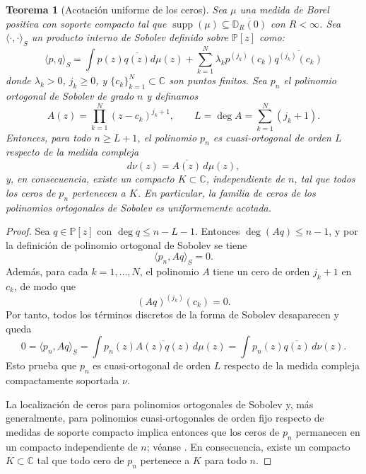 \documentclass[12pt,a4paper]{article}
\newtheorem{theorem}{Teorema}
\theoremstyle{definition}
\theoremstyle{remark}
\newcommand{\Poly}{\mathbb{P}[z]}
\begin{document}
\begin{theorem}[Acotación uniforme de los ceros]\label{thm:acotacion_ceros}
  Sea $\mu$ una medida de Borel positiva con soporte compacto tal que $\operatorname{supp}(\mu) \subseteq \overline{\mathbb{D}_R(0)}$ con $R < \infty$. Sea $\langle \cdot, \cdot \rangle_S$ un producto interno de Sobolev definido sobre $\Poly$ como:
  \begin{equation}\label{eq:sobolev_general}
    \langle p, q \rangle_S = \int p(z)\overline{q(z)} d\mu(z) + \sum_{k=1}^N \lambda_k p^{(j_k)}(c_k) \overline{q^{(j_k)}(c_k)}
  \end{equation}
  donde $\lambda_k > 0$, $j_k \ge 0$, y $\{c_k\}_{k=1}^N \subset \mathbb{C}$ son puntos finitos. Sea $p_n$ el polinomio ortogonal de Sobolev de grado $n$ y definamos
  \[
    A(z)=\prod_{k=1}^N (z-c_k)^{j_k+1},
    \qquad
    L = \deg A = \sum_{k=1}^N (j_k+1).
  \]
  Entonces, para todo $n \ge L+1$, el polinomio $p_n$ es cuasi-ortogonal de orden $L$ respecto de la medida compleja
  \[
    d\nu(z)=\overline{A(z)}\,d\mu(z),
  \]
  y, en consecuencia, existe un compacto $K \subset \mathbb{C}$, independiente de $n$, tal que todos los ceros de $p_n$ pertenecen a $K$. En particular, la familia de ceros de los polinomios ortogonales de Sobolev es uniformemente acotada.
\end{theorem}

\begin{proof}
  Sea $q \in \Poly$ con $\deg q \le n-L-1$. Entonces $\deg(Aq) \le n-1$, y por la definición de polinomio ortogonal de Sobolev se tiene
  \[
    \langle p_n, Aq \rangle_S = 0.
  \]
  Además, para cada $k=1,\dots,N$, el polinomio $A$ tiene un cero de orden $j_k+1$ en $c_k$, de modo que
  \[
    (Aq)^{(j_k)}(c_k)=0.
  \]
  Por tanto, todos los términos discretos de la forma de Sobolev desaparecen y queda
  \[
    0 = \langle p_n, Aq \rangle_S = \int p_n(z)\overline{A(z)q(z)}\,d\mu(z) = \int p_n(z)\overline{q(z)}\,d\nu(z).
  \]
  Esto prueba que $p_n$ es cuasi-ortogonal de orden $L$ respecto de la medida compleja compactamente soportada $\nu$.

  La localización de ceros para polinomios ortogonales de Sobolev y, más generalmente, para polinomios cuasi-ortogonales de orden fijo respecto de medidas de soporte compacto implica entonces que los ceros de $p_n$ permanecen en un compacto independiente de $n$; véanse \cite{lopez1999zero,lopez2001sobolev,marcellan2015sobolev}. En consecuencia, existe un compacto $K \subset \mathbb{C}$ tal que todo cero de $p_n$ pertenece a $K$ para todo $n$.
\end{proof}
\end{document}
